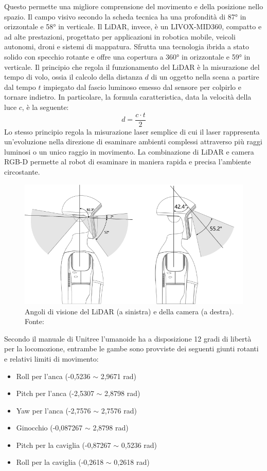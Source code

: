 Questo permette una migliore comprensione del movimento e della posizione nello spazio. Il campo visivo secondo la scheda tecnica \cite{unitreeManual2025} ha una profondità di 87° in orizzontale e 58° in verticale. Il LiDAR, invece, è un LIVOX-MID360, compatto e ad alte prestazioni, progettato per applicazioni in robotica mobile, veicoli autonomi, droni e sistemi di mappatura. Sfrutta una tecnologia ibrida a stato solido con specchio rotante e offre una copertura a 360° in orizzontale e 59° in verticale. Il principio che regola il funzionamento del LiDAR è la misurazione del tempo di volo, ossia il calcolo della distanza $d$ di un oggetto nella scena a partire dal tempo $t$ impiegato dal fascio luminoso emesso dal sensore per colpirlo e tornare indietro. In particolare, la formula caratteristica, data la velocità della luce $c$, è la seguente:
\begin{equation}
    d = \frac{c\cdot t}{2}
\end{equation}
Lo stesso principio regola la misurazione laser semplice di cui il laser rappresenta un'evoluzione nella direzione di esaminare ambienti complessi attraverso più raggi luminosi o un unico raggio in movimento. La combinazione di LiDAR e camera RGB-D permette al robot di esaminare in maniera rapida e precisa l'ambiente circostante.

\begin{figure}[h]
    \centering
    \includegraphics[width=0.5\linewidth]{immagini/sensori_g1.png}
    \caption{Angoli di visione del LiDAR (a sinistra) e della camera (a destra). Fonte: \cite{unitreeManual2025}}
    \label{fig:sensori_g1}
\end{figure}

Secondo il manuale di Unitree \cite{unitreeManual2025} l'umanoide ha a disposizione 12 gradi di libertà per la locomozione, entrambe le gambe sono provviste dei seguenti giunti rotanti e relativi limiti di movimento:

\begin{itemize}
    \item Roll per l'anca (-0,5236 $\sim$ 2,9671 rad)
    \item Pitch per l'anca (-2,5307 $\sim$ 2,8798 rad)
    \item Yaw per l'anca (-2,7576 $\sim$ 2,7576 rad)
    \item Ginocchio (-0,087267 $\sim$ 2,8798 rad)
    \item Pitch per la caviglia (-0,87267 $\sim$ 0,5236 rad)
    \item Roll per la caviglia (-0,2618 $\sim$ 0,2618 rad)
\end{itemize}

